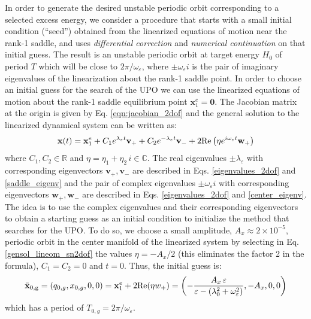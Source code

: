 \documentclass{ws-ijbc}
\begin{document}
In order to generate the desired unstable periodic orbit corresponding to a selected excess energy, we consider a procedure that starts with a small initial condition (``seed'') obtained from the linearized equations of motion near the rank-1 saddle, and uses {\it differential correction} and {\it numerical continuation}\cite{Koon2011,naik2017geometry,ross2018experimental} on that initial guess. The result is an unstable periodic orbit at target energy $H_0$ of period $T$ which will be close to $2\pi/\omega_{\varepsilon}$, where $\pm \omega_\varepsilon i$ is the pair of imaginary eigenvalues of the linearization about the rank-1 saddle point. In order to choose an initial guess for the search of the UPO we can use the linearized equations of motion about the rank-1 saddle equilibrium point $\mathbf{x}_1^e = \mathbf{0}$. The Jacobian matrix at the origin is given by Eq. \eqref{eqn:jacobian_2dof} and the general solution to the linearized dynamical system can be written as:
\begin{equation}
\mathbf{x}(t) = \mathbf{x}_1^e +  C_1 e^{\lambda_\varepsilon t} \mathbf{v}_+ + C_2 e^{-\lambda_\varepsilon t} \mathbf{v}_- + 2 {\rm Re}\left(\eta e^{i\omega_\varepsilon t} \mathbf{w}_+ \right)
\label{gensol_lineom_sn2dof}
\end{equation}
where $C_1,C_2 \in \mathbb{R}$ and $\eta = \eta_1 + \eta_2 \, i \in \mathbb{C}$. The real eigenvalues $\pm \lambda_\varepsilon$ with corresponding eigenvectors $\mathbf{v}_+, \mathbf{v}_-$ are described in Eqs.  \eqref{eigenvalues_2dof} and \eqref{saddle_eigenv} and the pair of complex eigenvalues $\pm \omega_\varepsilon i$ with corresponding eigenvectors $\mathbf{w}_+, \mathbf{w}_-$ are described in Eqs.  \eqref{eigenvalues_2dof} and \eqref{center_eigenv}. The idea is to use the complex eigenvalues and their corresponding eigenvectors to obtain a starting guess as an initial condition to initialize the method that searches for the UPO. To do so, we choose a small amplitude, $A_x \approx 2 \times 10^{-5}$, periodic orbit in the center manifold of the linearized system by selecting in Eq. \eqref{gensol_lineom_sn2dof} the values $\eta = - A_x/2$ (this eliminates the factor 2 in the formula), $C_1 = C_2 = 0$ and $t = 0$. Thus, the initial guess is:
\begin{equation}
\bar{\mathbf{x}}_{\rm 0,g} = (q_{0,g},x_{0,g},0,0) = \mathbf{x}^e_1 + 
2{\rm Re}(\eta w_+) = \left(-\dfrac{A_x \, \varepsilon}{\varepsilon - \left(\lambda_0^2 + \omega^2_\varepsilon\right)},-A_x,0,0\right)
\label{eqn:initial_guess_sn2dof}
\end{equation}
which has a period of $T_{0,g} = 2\pi / \omega_\varepsilon$.
\end{document}
